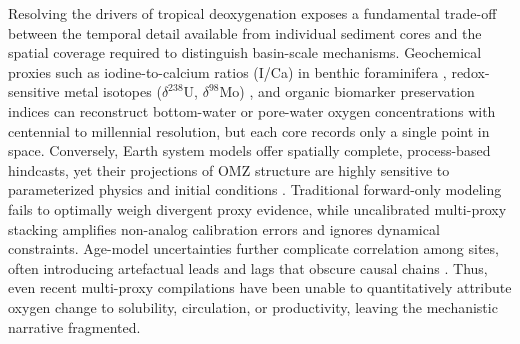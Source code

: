 \documentclass{article}
\begin{document}
Resolving the drivers of tropical deoxygenation exposes a fundamental trade-off between the temporal detail available from individual sediment cores and the spatial coverage required to distinguish basin-scale mechanisms. Geochemical proxies such as iodine-to-calcium ratios (I/Ca) in benthic foraminifera \cite{lu2016iodine, hoogakker2018glacial}, redox-sensitive metal isotopes ($\delta^{238}$U, $\delta^{98}$Mo) \cite{montoya2018uranium, chen2022molybdenum}, and organic biomarker preservation indices \cite{dumont2015lipid, lengger2019glycerol} can reconstruct bottom-water or pore-water oxygen concentrations with centennial to millennial resolution, but each core records only a single point in space. Conversely, Earth system models offer spatially complete, process-based hindcasts, yet their projections of OMZ structure are highly sensitive to parameterized physics and initial conditions \cite{ridgwell2010geochemical, winguth2012global}. Traditional forward-only modeling fails to optimally weigh divergent proxy evidence, while uncalibrated multi-proxy stacking amplifies non-analog calibration errors and ignores dynamical constraints. Age-model uncertainties further complicate correlation among sites, often introducing artefactual leads and lags that obscure causal chains \cite{westerhold2020astronomical, zeebe2017anthropogenic}. Thus, even recent multi-proxy compilations \cite{clarkson2020upper, bond2024redox} have been unable to quantitatively attribute oxygen change to solubility, circulation, or productivity, leaving the mechanistic narrative fragmented.
\end{document}
